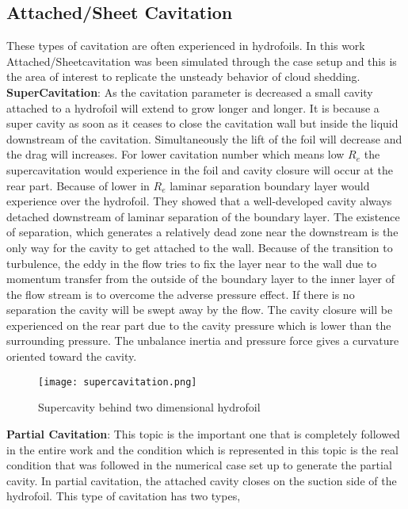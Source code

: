 \subsection{Attached/Sheet Cavitation}
These types of cavitation are often experienced in hydrofoils. In this work Attached/Sheetcavitation was been simulated through the case setup and this is the area of interest to replicate the unsteady behavior of cloud shedding.\\
\textbf{SuperCavitation}: As the cavitation parameter is decreased a small cavity attached to a hydrofoil will extend to grow longer and longer. It is because a super cavity as soon as it ceases to close the cavitation
wall but inside the liquid downstream of the cavitation. Simultaneously the lift of the foil will decrease and the drag will increases. For lower cavitation number which means low $R_e$ the supercavitation 
would experience in the foil and cavity closure will occur at the rear part. Because of lower in $R_e$ laminar separation boundary layer would experience over the hydrofoil. They showed that a well-developed 
cavity always detached downstream of laminar separation of the boundary layer. The existence of separation, which generates a relatively dead zone near the downstream is the only way for the cavity to get attached to the wall. Because 
of the transition to turbulence, the eddy in the flow tries to fix the layer near to the wall due to momentum transfer from the outside of the boundary layer to the inner layer of the flow stream is to overcome the adverse pressure effect. If there is no separation the cavity 
will be swept away by the flow. The cavity closure will be experienced on the rear part due to the cavity pressure which is lower than the surrounding pressure. The unbalance inertia and pressure force gives a 
curvature oriented toward the cavity.\\
\begin{figure}[H]
 \centering
 \texttt{[image: supercavitation.png]}
 \caption{Supercavity behind two dimensional hydrofoil}
  \label{fig:fig10}
\end{figure}

\textbf{Partial Cavitation}: This topic is the important one that is completely followed in the entire work and the condition which is represented in this topic is the real condition that was followed in the numerical
 case set up to generate the partial cavity. In partial cavitation, the attached cavity closes on the suction side of the hydrofoil. This type of cavitation has two types,

